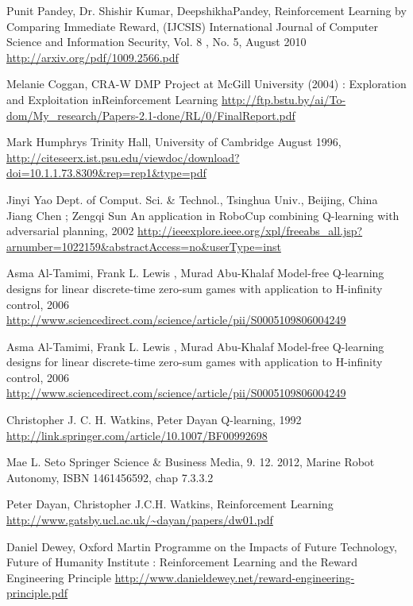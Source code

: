 \begin{thebibliography}{99}
 Punit Pandey, Dr. Shishir Kumar, DeepshikhaPandey,
Reinforcement Learning by Comparing Immediate Reward, (IJCSIS)
International Journal of Computer Science and Information Security, Vol. 8
, No. 5, August 2010
\url{http://arxiv.org/pdf/1009.2566.pdf}

 Melanie Coggan, CRA-W DMP Project at McGill University (2004) :
Exploration and Exploitation inReinforcement Learning
\url{http://ftp.bstu.by/ai/To-dom/My_research/Papers-2.1-done/RL/0/FinalReport.pdf}

 Mark Humphrys Trinity Hall, University of Cambridge August 1996,
\url{http://citeseerx.ist.psu.edu/viewdoc/download?doi=10.1.1.73.8309&rep=rep1&type=pdf}

Jinyi Yao Dept. of Comput. Sci. \& Technol., Tsinghua Univ., Beijing, China Jiang Chen ; Zengqi Sun
An application in RoboCup combining Q-learning with adversarial planning, 2002
\url{http://ieeexplore.ieee.org/xpl/freeabs_all.jsp?arnumber=1022159&abstractAccess=no&userType=inst}


 Asma Al-Tamimi, Frank L. Lewis , Murad Abu-Khalaf
Model-free Q-learning designs for linear discrete-time zero-sum games with application to H-infinity control, 2006
\url{http://www.sciencedirect.com/science/article/pii/S0005109806004249}

 Asma Al-Tamimi, Frank L. Lewis , Murad Abu-Khalaf
Model-free Q-learning designs for linear discrete-time zero-sum games with application to H-infinity control, 2006
\url{http://www.sciencedirect.com/science/article/pii/S0005109806004249}

Christopher J. C. H. Watkins, Peter Dayan
Q-learning, 1992
\url{http://link.springer.com/article/10.1007/BF00992698}

Mae L. Seto Springer Science \& Business Media, 9. 12. 2012,
Marine Robot Autonomy, ISBN	1461456592, chap 7.3.3.2

Peter Dayan, Christopher J.C.H. Watkins,
Reinforcement Learning
\url{http://www.gatsby.ucl.ac.uk/~dayan/papers/dw01.pdf}


Daniel Dewey, Oxford Martin Programme on the Impacts of Future Technology,
Future of Humanity Institute :
Reinforcement Learning and the Reward Engineering Principle
\url{http://www.danieldewey.net/reward-engineering-principle.pdf}

\end{thebibliography}
